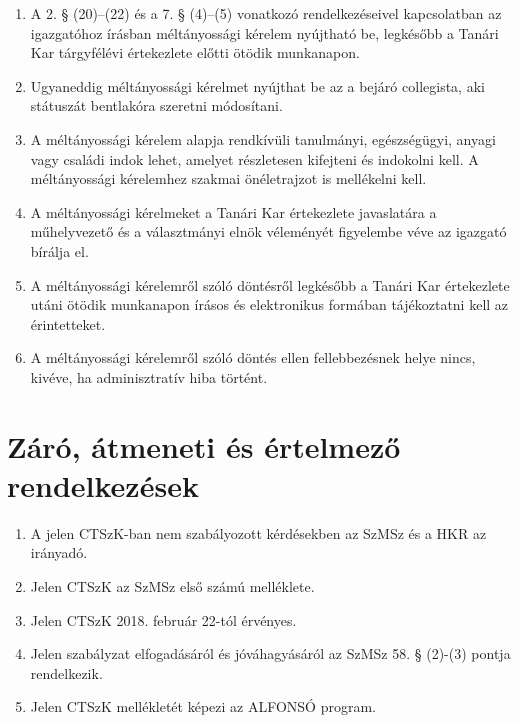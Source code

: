 \documentclass[11pt]{article}
\begin{document}
\begin{enumerate}
	\item	A 2. § (20)--(22) és a 7. § (4)--(5) vonatkozó rendelkezéseivel kapcsolatban az igazgatóhoz írásban méltányossági kérelem nyújtható be, legkésőbb a Tanári Kar tárgyfélévi értekezlete előtti ötödik munkanapon.
	\item	Ugyaneddig méltányossági kérelmet nyújthat be az a bejáró collegista, aki státuszát bentlakóra szeretni módosítani.
	\item	A méltányossági kérelem alapja rendkívüli tanulmányi, egészségügyi, anyagi vagy családi indok lehet, amelyet részletesen kifejteni és indokolni kell. A méltányossági kérelemhez szakmai önéletrajzot is mellékelni kell.
	\item	A méltányossági kérelmeket a Tanári Kar értekezlete javaslatára a műhelyvezető és a választmányi elnök véleményét figyelembe véve az igazgató bírálja el.
	\item	A méltányossági kérelemről szóló döntésről legkésőbb a Tanári Kar értekezlete utáni ötödik munkanapon írásos és elektronikus formában tájékoztatni kell az érintetteket.
	\item	A méltányossági kérelemről szóló döntés ellen fellebbezésnek helye nincs, kivéve, ha adminisztratív hiba történt.
\end{enumerate}	


\section{Záró, átmeneti és értelmező rendelkezések}

\begin{enumerate}
	\item	A jelen CTSzK-ban nem szabályozott kérdésekben az SzMSz és a HKR az irányadó.
	\item	Jelen CTSzK az SzMSz első számú melléklete.
	\item	Jelen CTSzK 2018. február 22-tól érvényes.
	\item	Jelen szabályzat elfogadásáról és jóváhagyásáról az SzMSz 58. § (2)-(3) pontja rendelkezik. %
	\item	Jelen CTSzK mellékletét képezi az ALFONSÓ program.
\end{enumerate}
\end{document}
